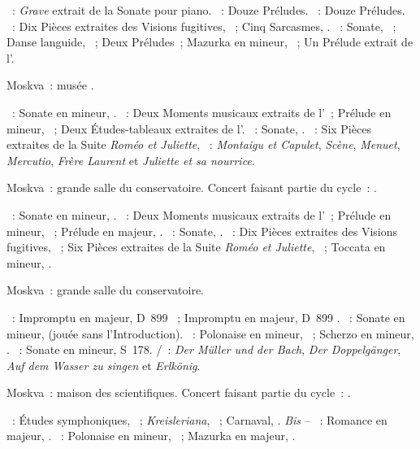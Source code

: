 \begin{description}
 \textsc{\BogdanovBerezovsky{}}~: \emph{Grave} extrait de la Sonate pour
 piano.
 \textsc{\Chostakovitch{}}~: Douze Préludes.
 \textsc{\Kabalevski{}}~: Douze Préludes.
 \textsc{\Prokofiev{}}~: Dix Pièces extraites des Visions fugitives,
 ~; Cinq Sarcasmes, .
 \textsc{\Scriabine{}}~: Sonate, ~; Danse languide, 
 ~; Deux Préludes~; Mazurka en \kE mineur,  ~;
 Un Prélude extrait de l'.
 \item[\DateWithWeekDay{1947-11-21}]
 Moskva~: musée \Scriabine{}.

 \textsc{\Beethoven{}}~: Sonate en \kF mineur, .
 \textsc{\Rachmaninov{}}~: Deux Moments musicaux extraits de l'~;
 Prélude en \kC mineur,  ~; Deux Études-tableaux
 extraites de l'.
 \textsc{\Scriabine{}}~: Sonate, .
 \textsc{\Prokofiev{}}~: Six Pièces extraites de la Suite \emph{Roméo et
 Juliette}, ~: \emph{Montaigu et Capulet}, \emph{Scène},
 \emph{Menuet}, \emph{Mercutio}, \emph{Frère Laurent} et \emph{Juliette et
 sa nourrice}.
 \item[\DateWithWeekDay{1947-11-26}]
 Moskva~: grande salle du conservatoire.
 Concert faisant partie du cycle~: .

 \textsc{\Beethoven{}}~: Sonate en \kF mineur, .
 \textsc{\Rachmaninov{}}~: Deux Moments musicaux extraits de l'~;
 Prélude en \kC mineur,  ~; Prélude en \kG majeur,
  .
 \textsc{\Scriabine{}}~: Sonate, .
 \textsc{\Prokofiev{}}~: Dix Pièces extraites des Visions fugitives,
 ~; Six Pièces extraites de la Suite \emph{Roméo et Juliette},
 ~; Toccata en \kD mineur, .
 \item[\DateWithWeekDay{1947-12-17}]
 Moskva~: grande salle du conservatoire.

 \textsc{\Schubert{}}~: Impromptu en \kG \Flat majeur, D~899 ~;
 Impromptu en \kA \Flat majeur, D~899 .
 \textsc{\Schumann{}}~: Sonate en \kF \Sharp mineur,  (jouée sans
 l'\hbox{Introduction}).
 \textsc{\Chopin{}}~: Polonaise en \kF \Sharp mineur, ~; Scherzo en
 \kB mineur, .
 \textsc{\Liszt{}}~: Sonate en \kB mineur, S~178.
 \textsc{\Schubert{}/\Liszt{}}~: \emph{Der Müller und der Bach}, \emph{Der
 Doppelgänger}, \emph{Auf dem Wasser zu singen} et \emph{Erlkönig}.
 \item[\DateWithWeekDay{1947-12-28}]
 Moskva~: maison des scientifiques.
 Concert faisant partie du cycle~: .

 \textsc{\Schumann{}}~: Études symphoniques, ~;
 \emph{Kreisleriana}, ~; Carnaval, .
 \emph{Bis} -- \textsc{\Schumann{}}~: Romance en \kF \Sharp majeur,
  .
 \textsc{\Chopin{}}~: Polonaise en \kF \Sharp mineur, ~; Mazurka en
 \kD \Flat majeur,  .
\end{description}

